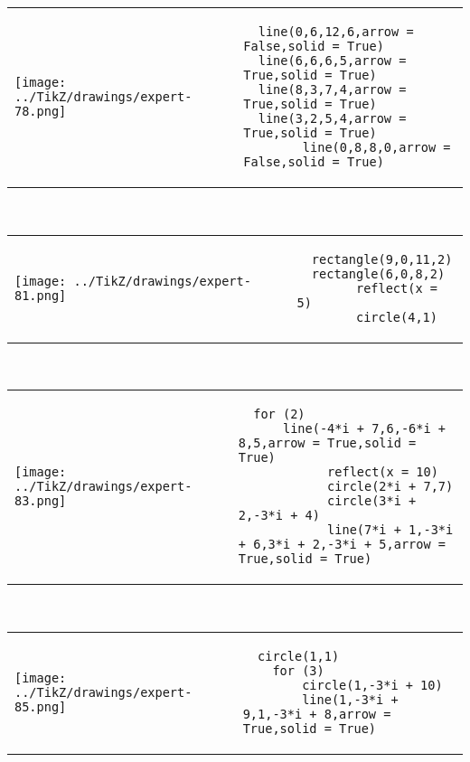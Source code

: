             \begin{tabular}{ll}
    \texttt{[image: ../TikZ/drawings/expert-78.png]}&
    
        \begin{minipage}{10cm}
        \begin{verbatim}
  line(0,6,12,6,arrow = False,solid = True)
  line(6,6,6,5,arrow = True,solid = True)
  line(8,3,7,4,arrow = True,solid = True)
  line(3,2,5,4,arrow = True,solid = True)
        line(0,8,8,0,arrow = False,solid = True)
        \end{verbatim}
\end{minipage}

    \end{tabular}        
            \\

            \begin{tabular}{ll}
    \texttt{[image: ../TikZ/drawings/expert-81.png]}&
    
        \begin{minipage}{10cm}
        \begin{verbatim}
  rectangle(9,0,11,2)
  rectangle(6,0,8,2)
        reflect(x = 5)
        circle(4,1)
        \end{verbatim}
\end{minipage}

    \end{tabular}        
            \\

            \begin{tabular}{ll}
    \texttt{[image: ../TikZ/drawings/expert-83.png]}&
    
        \begin{minipage}{10cm}
        \begin{verbatim}
  for (2)
      line(-4*i + 7,6,-6*i + 8,5,arrow = True,solid = True)
            reflect(x = 10)
            circle(2*i + 7,7)
            circle(3*i + 2,-3*i + 4)
            line(7*i + 1,-3*i + 6,3*i + 2,-3*i + 5,arrow = True,solid = True)
        \end{verbatim}
\end{minipage}

    \end{tabular}        
            \\

            \begin{tabular}{ll}
    \texttt{[image: ../TikZ/drawings/expert-85.png]}&
    
        \begin{minipage}{10cm}
        \begin{verbatim}
  circle(1,1)
    for (3)
        circle(1,-3*i + 10)
        line(1,-3*i + 9,1,-3*i + 8,arrow = True,solid = True)
        \end{verbatim}
\end{minipage}

    \end{tabular}        
            \\

